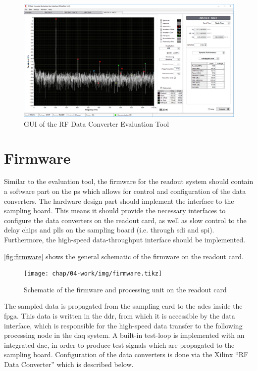 \begin{figure}[tbh]
	\centering
	\includegraphics[width = \textwidth]{chap/04-work/img/evaltool}
	\caption{GUI of the RF Data Converter Evaluation Tool}
	\label{fig:gui}
\end{figure}

\section{Firmware}\label{sec:firmware}
Similar to the evaluation tool, the firmware for the readout system should contain a software part on the \gls{ps} which allows for control and configuration of the data converters. 
The hardware design part should implement the interface to the sampling board. 
This means it should provide the necessary interfaces to configure the data converters on the readout card, as well as slow control to the delay chips and \glspl{pll} on the sampling board (i.e. through \gls{sdi} and \gls{spi}). 
Furthermore, the high-speed data-throughput interface should be implemented.

\autoref{fig:firmware} shows the general schematic of the firmware on the readout card.
\begin{figure}[tbh]
	\centering
	\texttt{[image: chap/04-work/img/firmware.tikz]}
	\caption{Schematic of the firmware and processing unit on the readout card}
	\label{fig:firmware}
\end{figure}

The sampled data is propagated from the sampling card to the \glspl{adc} inside the \gls{fpga}. 
This data is written in the \gls{ddr}, from which it is accessible by the data interface, which is responsible for the high-speed data transfer to the following processing node in the \gls{daq} system.
A built-in test-loop is implemented with an integrated \gls{dac}, in order to produce test signals which are propagated to the sampling board.
Configuration of the data converters is done via the Xilinx ``RF Data Converter'' which is described below. 

